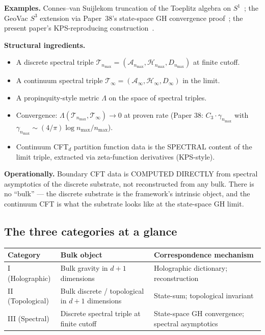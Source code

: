 \documentclass[11pt,a4paper]{article}
\theoremstyle{plain}
\theoremstyle{definition}
\newcommand{\nmax}{n_{\max}}
\newcommand{\sthree}{S^{3}}
\newcommand{\Hilb}{\mathcal{H}}
\newcommand{\Acal}{\mathcal{A}}
\newcommand{\Tcal}{\mathcal{T}}
\begin{document}
\textbf{Examples.} Connes--van Suijlekom truncation of the Toeplitz
algebra on $S^{1}$~\cite{connes_vs2021}; the GeoVac $\sthree$
extension via Paper~38's state-space GH convergence proof~\cite{paper38}; the present
paper's KPS-reproducing construction~\cite{paper50}.

\textbf{Structural ingredients.}
\begin{itemize}
\item A discrete spectral triple
$\Tcal_{\nmax} = (\Acal_{\nmax}, \Hilb_{\nmax}, D_{\nmax})$ at
finite cutoff.
\item A continuum spectral triple
$\Tcal_{\infty} = (\Acal_{\infty}, \Hilb_{\infty}, D_{\infty})$ in
the limit.
\item A propinquity-style metric $\Lambda$ on the space of spectral
triples.
\item Convergence: $\Lambda(\Tcal_{\nmax}, \Tcal_{\infty}) \to 0$ at
proven rate (Paper 38: $C_{3} \cdot \gamma_{\nmax}$ with
$\gamma_{\nmax} \sim (4/\pi) \log\nmax / \nmax$).
\item Continuum CFT$_{d}$ partition function data is the SPECTRAL
content of the limit triple, extracted via zeta-function derivatives
(KPS-style).
\end{itemize}

\textbf{Operationally.} Boundary CFT data is COMPUTED DIRECTLY from
spectral asymptotics of the discrete substrate, not reconstructed from
any bulk. There is no ``bulk'' --- the discrete substrate is the
framework's intrinsic object, and the continuum CFT is what the
substrate looks like at the state-space GH limit.

\subsection{The three categories at a glance}

\begin{center}
\begin{tabular}{lll}
\toprule
Category & Bulk object & Correspondence mechanism \\
\midrule
I (Holographic) & Bulk gravity in $d+1$ dimensions & Holographic dictionary; reconstruction \\
II (Topological) & Bulk discrete / topological in $d+1$ dimensions & State-sum; topological invariant \\
III (Spectral) & Discrete spectral triple at finite cutoff & State-space GH convergence; spectral asymptotics \\
\bottomrule
\end{tabular}
\end{center}
\end{document}
